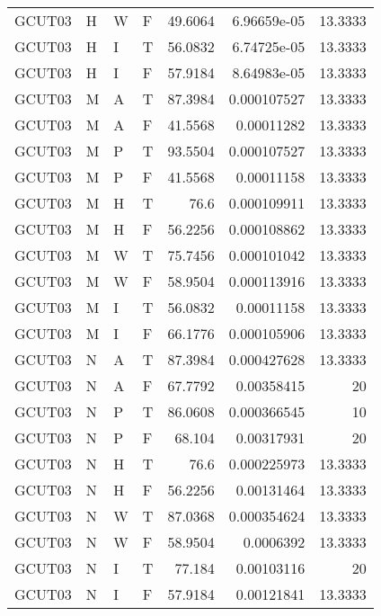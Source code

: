 \begin{table}[!htb]
{\begin{tabular}{llllrrr}
            GCUT03   & H     & W     & F          & 49.6064    & 6.96659e-05 & 13.3333  \\
            GCUT03   & H     & I     & T          & 56.0832    & 6.74725e-05 & 13.3333  \\
            GCUT03   & H     & I     & F          & 57.9184    & 8.64983e-05 & 13.3333  \\
            GCUT03   & M     & A     & T          & 87.3984    & 0.000107527 & 13.3333  \\
            GCUT03   & M     & A     & F          & 41.5568    & 0.00011282  & 13.3333  \\
            GCUT03   & M     & P     & T          & 93.5504    & 0.000107527 & 13.3333  \\
            GCUT03   & M     & P     & F          & 41.5568    & 0.00011158  & 13.3333  \\
            GCUT03   & M     & H     & T          & 76.6       & 0.000109911 & 13.3333  \\
            GCUT03   & M     & H     & F          & 56.2256    & 0.000108862 & 13.3333  \\
            GCUT03   & M     & W     & T          & 75.7456    & 0.000101042 & 13.3333  \\
            GCUT03   & M     & W     & F          & 58.9504    & 0.000113916 & 13.3333  \\
            GCUT03   & M     & I     & T          & 56.0832    & 0.00011158  & 13.3333  \\
            GCUT03   & M     & I     & F          & 66.1776    & 0.000105906 & 13.3333  \\
            GCUT03   & N     & A     & T          & 87.3984    & 0.000427628 & 13.3333  \\
            GCUT03   & N     & A     & F          & 67.7792    & 0.00358415  & 20       \\
            GCUT03   & N     & P     & T          & 86.0608    & 0.000366545 & 10       \\
            GCUT03   & N     & P     & F          & 68.104     & 0.00317931  & 20       \\
            GCUT03   & N     & H     & T          & 76.6       & 0.000225973 & 13.3333  \\
            GCUT03   & N     & H     & F          & 56.2256    & 0.00131464  & 13.3333  \\
            GCUT03   & N     & W     & T          & 87.0368    & 0.000354624 & 13.3333  \\
            GCUT03   & N     & W     & F          & 58.9504    & 0.0006392   & 13.3333  \\
            GCUT03   & N     & I     & T          & 77.184     & 0.00103116  & 20       \\
            GCUT03   & N     & I     & F          & 57.9184    & 0.00121841  & 13.3333  \\
            \hline
        \end{tabular}
    }{}
\end{table}